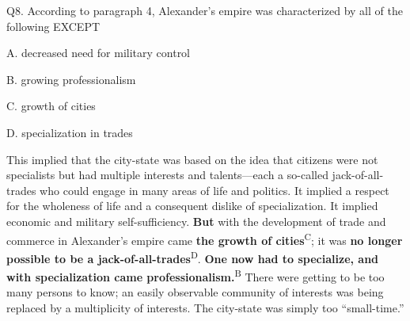 \begin{blk}
    \begin{qst}
        Q8. According to paragraph 4, Alexander’s empire was characterized by all of the following EXCEPT
    \end{qst}

    \begin{chc}
        A. decreased need for military control

        B. growing professionalism

        C. growth of cities

        D. specialization in trades
    \end{chc}

    \begin{psgq}
        This implied that the city-state was based on the idea that citizens were not specialists but had multiple interests and talents—each a so-called jack-of-all-trades who could engage in many areas of life and politics. It implied a respect for the wholeness of life and a consequent dislike of specialization. It implied economic and military self-sufficiency. \textbf{But} with the development of trade and commerce in Alexander’s empire came \textbf{the growth of cities}\textsuperscript{C}; it was \textbf{no longer possible to be a jack-of-all-trades}\textsuperscript{D}. \textbf{One now had to specialize, and with specialization came professionalism.}\textsuperscript{B} There were getting to be too many persons to know; an easily observable community of interests was being replaced by a multiplicity of interests. The city-state was simply too “small-time.”
    \end{psgq}
\end{blk}

\newpage